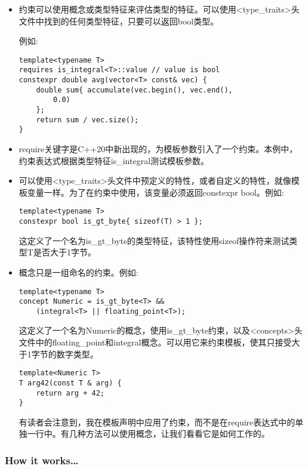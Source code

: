 \begin{itemize}
\item 
约束可以使用概念或类型特征来评估类型的特征。可以使用<type\_traits>头文件中找到的任何类型特征，只要可以返回bool类型。

例如:

\begin{lstlisting}[style=styleCXX]
template<typename T>
requires is_integral<T>::value // value is bool
constexpr double avg(vector<T> const& vec) {
	double sum{ accumulate(vec.begin(), vec.end(),
		0.0)
	};
	return sum / vec.size();
}
\end{lstlisting}

\item 
require关键字是C++20中新出现的，为模板参数引入了一个约束。本例中，约束表达式根据类型特征is\_integral测试模板参数。

\item 
可以使用<type\_traits>头文件中预定义的特性，或者自定义的特性，就像模板变量一样。为了在约束中使用，该变量必须返回constexpr bool。例如:

\begin{lstlisting}[style=styleCXX]
template<typename T>
constexpr bool is_gt_byte{ sizeof(T) > 1 };
\end{lstlisting}

这定义了一个名为is\_gt\_byte的类型特征，该特性使用sizeof操作符来测试类型T是否大于1字节。

\item 
概念只是一组命名的约束。例如:

\begin{lstlisting}[style=styleCXX]
template<typename T>
concept Numeric = is_gt_byte<T> &&
	(integral<T> || floating_point<T>);
\end{lstlisting}

这定义了一个名为Numeric的概念，使用is\_gt\_byte约束，以及<concepts>头文件中的floating\_point和integral概念。可以用它来约束模板，使其只接受大于1字节的数字类型。

\begin{lstlisting}[style=styleCXX]
template<Numeric T>
T arg42(const T & arg) {
	return arg + 42;
}
\end{lstlisting}

有读者会注意到，我在模板声明中应用了约束，而不是在require表达式中的单独一行中。有几种方法可以使用概念，让我们看看它是如何工作的。
\end{itemize}

\subsubsection{How it works…}

